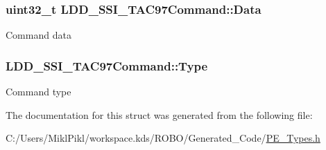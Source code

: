 \subsubsection[{Data}]{\setlength{\rightskip}{0pt plus 5cm}uint32\+\_\+t L\+D\+D\+\_\+\+S\+S\+I\+\_\+\+T\+A\+C97\+Command\+::\+Data}\label{struct_l_d_d___s_s_i___t_a_c97_command_abc16535d09d61f2c3f885adf91632117}
Command data \hypertarget{struct_l_d_d___s_s_i___t_a_c97_command_ac7226beaf57a764f71faf7e822e27a6e}{}
\subsubsection[{Type}]{ L\+D\+D\+\_\+\+S\+S\+I\+\_\+\+T\+A\+C97\+Command\+::\+Type}\label{struct_l_d_d___s_s_i___t_a_c97_command_ac7226beaf57a764f71faf7e822e27a6e}
Command type 

The documentation for this struct was generated from the following file\+:\begin{DoxyCompactItemize}
\item 
C\+:/\+Users/\+Mikl\+Pikl/workspace.\+kds/\+R\+O\+B\+O/\+Generated\+\_\+\+Code/\hyperlink{_p_e___types_8h}{P\+E\+\_\+\+Types.\+h}\end{DoxyCompactItemize}
